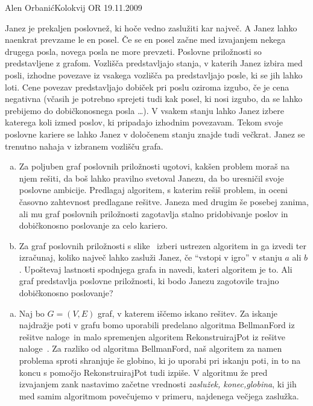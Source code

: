 \begin{naloga}{Alen Orbanić}{Kolokvij OR 19.11.2009}
    \begin{vprasanje}
    Janez je prekaljen poslovnež, ki hoče vedno zaslužiti kar največ.
    A Janez lahko naenkrat prevzame le en posel.
    Če se en posel začne med izvajanjem nekega drugega posla,
    novega posla ne more prevzeti.
    Poslovne priložnosti so predstavljene z grafom.
    Vozlišča predstavljajo stanja, v katerih Janez izbira med posli,
    izhodne povezave iz vsakega vozlišča pa predstavljajo posle,
    ki se jih lahko loti.
    Cene povezav predstavljajo dobiček pri poslu oziroma izgubo,
    če je cena negativna
    (včasih je potrebno sprejeti tudi kak posel, ki nosi izgubo,
    da se lahko prebijemo do dobičkonosnega posla \dots).
    V vsakem stanju lahko Janez izbere katerega koli izmed poslov,
    ki pripadajo izhodnim povezavam.
    Tekom svoje poslovne kariere se lahko Janez
    v določenem stanju znajde tudi večkrat.
    Janez se trenutno nahaja v izbranem vozlišču grafa.
    \begin{enumerate}[(a)]
    \item Za poljuben graf poslovnih priložnosti ugotovi,
    kakšen problem moraš na njem rešiti, da boš lahko pravilno svetoval Janezu,
    da bo uresničil svoje poslovne ambicije.
    Predlagaj algoritem, s katerim rešiš problem,
    in oceni časovno zahtevnost predlagane rešitve.
    Janeza med drugim še posebej zanima,
    ali mu graf poslovnih priložnosti zagotavlja stalno pridobivanje poslov
    in dobičkonosno poslovanje za celo kariero.
    \item Za graf poslovnih priložnosti s slike~\fig
    izberi ustrezen algoritem in ga izvedi ter izračunaj,
    koliko največ lahko zasluži Janez, če ``vstopi v igro'' v stanju $a$ ali $b$.
    Upoštevaj lastnosti spodnjega grafa in navedi, kateri algoritem je to.
    Ali graf predstavlja poslovne priložnosti,
    ki bodo Janezu zagotovile trajno dobičkonosno poslovanje?
    \end{enumerate}
    
    \begin{slika}
    \pgfslika
    \end{slika}
    \end{vprasanje}
    \begin{odgovor}
    \begin{enumerate}[(a)]
    \item Naj bo $G=(V,E)$ graf, v katerem iščemo iskano rešitev. Za iskanje najdražje poti 
    v grafu bomo uporabili predelano algoritma {\sc BellmanFord} iz rešitve naloge~\res[bf] 
    in malo spremenjen algoritem {\sc RekonstruirajPot} iz rešitve naloge~\res[topo]. Za 
    razliko od algoritma {\sc BellmanFord}, naš algoritem za namen problema sproti shranjuje
    še globino, ki jo uporabi pri iskanju poti, in to na koncu s pomočjo {\sc RekonstruirajPot}
    tudi izpiše. V algoritmu že pred izvajanjem zank nastavimo začetne vrednosti \textit{zaslužek,
    konec,globina}, ki jih med samim algoritmom povečujemo v primeru, najdenega večjega zaslužka.
    

\end{enumerate}
\end{odgovor}
\end{naloga}
